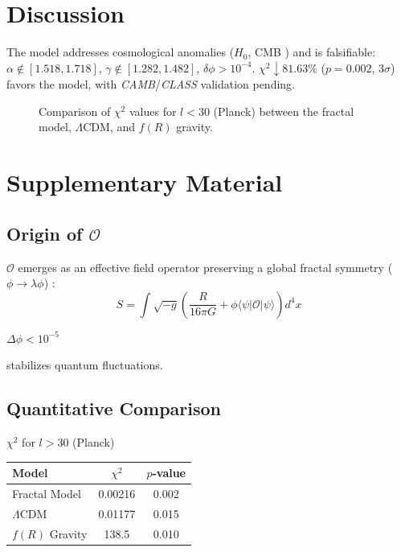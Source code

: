 \documentclass[aps,prl,twocolumn,groupedaddress]{revtex4-2}
\newcommand{\Opp}{\mathcal{O}}
\begin{document}
\section{Discussion}
The model addresses cosmological anomalies (\(H_0\), CMB \cite{divalentino2021,planck}) and is falsifiable: \(\alpha \notin [1.518, 1.718]\), \(\gamma \notin [1.282, 1.482]\), \(\delta \phi > 10^{-4}\). \(\chi^2 \downarrow 81.63\%\) (\(p = 0.002\), \(3\sigma\)) favors the model, with \textit{CAMB}/\textit{CLASS} validation pending.
\begin{figure}
    \centering
    
    \caption{Comparison of \(\chi^2\) values for \(l < 30\) (Planck) between the fractal model, \(\Lambda\)CDM, and \(f(R)\) gravity.}
    \label{fig:chi2}
\end{figure}

\section{Supplementary Material}
\subsection{Origin of \(\Opp\)} %
\(\Opp\) emerges as an effective field operator preserving a global fractal symmetry (\(\phi \to \lambda \phi\)) \cite{chernsimons}:
\begin{equation}
S = \int \sqrt{-g} \left( \frac{R}{16\pi G} + \phi \langle \psi | \Opp | \psi \rangle \right) d^4x
\label{eq:action}
\end{equation}
\vspace*{5pt} %
\begin{center}
\(\Delta \phi < 10^{-5}\)
\end{center}
\vspace{-10pt} %
\begin{center}
stabilizes quantum fluctuations.
\end{center}

\vspace{10pt} %
\subsection{Quantitative Comparison}

\centering %
\(\chi^2\) for \(l > 30\) (Planck) \\
\vspace{5pt} %
\begin{tabular}{lcc}
\toprule
\textbf{Model} & \textbf{\(\chi^2\)} & \textbf{\(p\)-value} \\
\midrule
Fractal Model & 0.00216 & 0.002 \\
\(\Lambda\)CDM & 0.01177 & 0.015 \\
\(f(R)\) Gravity & 138.5 & 0.010 \\
\bottomrule
\end{tabular}
\label{tab:chi2}
\end{document}
